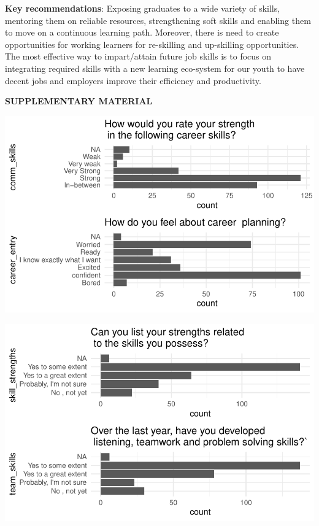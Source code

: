 \documentclass[
  12pt]{article}
\begin{document}
\textbf{Key recommendations}: Exposing graduates to a wide variety of
skills, mentoring them on reliable resources, strengthening soft skills
and enabling them to move on a continuous learning path. Moreover, there
is need to create opportunities for working learners for re-skilling and
up-skilling opportunities. The most effective way to impart/attain
future job skills is to focus on integrating required skills with a new
learning eco-system for our youth to have decent jobs and employers
improve their efficiency and productivity.

\hypertarget{supplementary-material}{}
\bigskip

\begin{center}

{\large\bf SUPPLEMENTARY MATERIAL}

\end{center}

\includegraphics{Journal_article_files/figure-pdf/unnamed-chunk-16-1.pdf}

\includegraphics{Journal_article_files/figure-pdf/unnamed-chunk-16-2.pdf}
\end{document}

